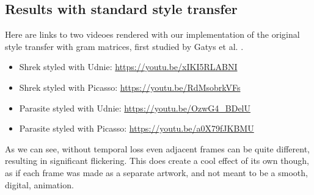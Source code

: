 \subsection{Results with standard style transfer}
Here are links to two videoes rendered with our implementation of the original style transfer with gram matrices, first studied by Gatys et al. \cite{Gatys:1}. 
\begin{itemize}
\item{Shrek styled with Udnie: \url{https://youtu.be/xIKI5RLABNI}}
\item{Shrek styled with Picasso: \url{https://youtu.be/RdMsobrkVFs}}
\item{Parasite styled with Udnie: \url{https://youtu.be/OzwG4_BDelU}}
\item{Parasite styled with Picasso: \url{https://youtu.be/a0X79fJKBMU}}
\end{itemize}
As we can see, without temporal loss even adjacent frames can be quite different, resulting in significant flickering. This does create a cool effect of its own though, as if each frame was made as a separate artwork, and not meant to be a smooth, digital, animation.